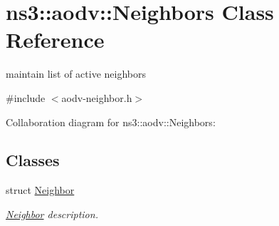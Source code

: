 \hypertarget{classns3_1_1aodv_1_1Neighbors}{}\section{ns3\+:\+:aodv\+:\+:Neighbors Class Reference}
\label{classns3_1_1aodv_1_1Neighbors}


maintain list of active neighbors  




{\ttfamily \#include $<$aodv-\/neighbor.\+h$>$}



Collaboration diagram for ns3\+:\+:aodv\+:\+:Neighbors\+:
\subsection*{Classes}
\begin{DoxyCompactItemize}
\item 
struct \hyperlink{structns3_1_1aodv_1_1Neighbors_1_1Neighbor}{Neighbor}
\begin{DoxyCompactList}\small\item\em \hyperlink{structns3_1_1aodv_1_1Neighbors_1_1Neighbor}{Neighbor} description. \end{DoxyCompactList}\end{DoxyCompactItemize}
